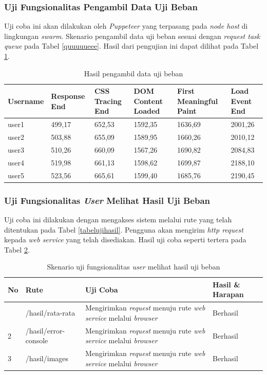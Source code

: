 			\subsubsection{Uji Fungsionalitas Pengambil Data Uji Beban}
				Uji coba ini akan dilakukan oleh \textit{Puppeteer} yang terpasang pada \textit{node host} di lingkungan \textit{swarm}. Skenario pengambil data uji beban sesuai dengan \textit{request task queue} pada Tabel \ref{quuuuueee}. Hasil dari pengujian ini dapat dilihat pada Tabel \ref{dataujibeban}.
				\begin{longtable}{|p{0.15\textwidth}|p{}|p{}|p{}|p{}|p{}|}
					\caption{Hasil pengambil data uji beban} \label{dataujibeban} \\
					\hline
					\textbf{Username} & \textbf{Response End} & \textbf{CSS Tracing End} & \textbf{DOM Content Loaded} & \textbf{First Meaningful Paint} & \textbf{Load Event End} \\ \hline
					\endhead
					\endfoot
					\endlastfoot
					user1 & 499,17 & 652,53 & 1592,35 & 1636,69 & 2001,26 \\ \hline
					user2 & 503,88 & 655,09 & 1589,95 & 1660,26 & 2010,12 \\ \hline
					user3 & 510,26 & 660,09 & 1567,26 & 1690,82 & 2084,83 \\ \hline
					user4 & 519,98 & 661,13 & 1598,62 & 1699,87 & 2188,10 \\ \hline
					user5 & 523,56 & 665,61 & 1599,40 & 1685,76 & 2190,45 \\ \hline
				\end{longtable}
				
			\subsubsection{Uji Fungsionalitas \textit{User} Melihat Hasil Uji Beban}
				Uji coba ini dilakukan dengan mengakses sistem melalui rute yang telah ditentukan pada Tabel \ref{tabelujihasil}. Pengguna akan mengirim \textit{http request} kepada \textit{web service} yang telah
				disediakan. Hasil uji coba seperti tertera pada Tabel \ref{tabelhasilujihasil}.
				\begin{longtable}{|p{}|p{}|p{0.30\textwidth}|p{}|}
					\caption{Skenario uji fungsionalitas \textit{user} melihat hasil uji beban} \label{tabelhasilujihasil} \\ \hline
					\textbf{No} & \textbf{Rute} & \textbf{Uji Coba} & \textbf{Hasil \& Harapan} \\ \hline
					\endhead
					\endfoot
					\endlastfoot
					1 & /hasil/rata-rata & Mengirimkan \textit{request} menuju rute \textit{web service} melalui \textit{browser} & Berhasil \\ \hline
					2 & /hasil/error-console & Mengirimkan \textit{request} menuju rute \textit{web service} melalui \textit{browser} & Berhasil \\ \hline
					3 & /hasil/images & Mengirimkan \textit{request} menuju rute \textit{web service} melalui \textit{browser} & Berhasil \\ \hline
				\end{longtable}
				

